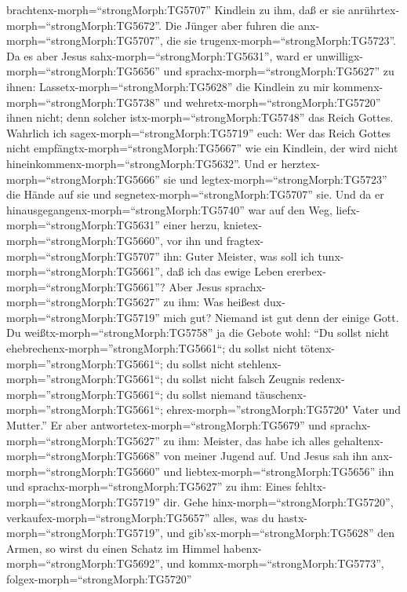 brachtenx-morph=``strongMorph:TG5707'' Kindlein zu ihm, daß er sie
anrührtex-morph=``strongMorph:TG5672''. Die Jünger aber fuhren die
anx-morph=``strongMorph:TG5707'', die sie
trugenx-morph=``strongMorph:TG5723''.  Da es aber Jesus
sahx-morph=``strongMorph:TG5631'', ward er
unwilligx-morph=``strongMorph:TG5656'' und
sprachx-morph=``strongMorph:TG5627'' zu ihnen:
Lassetx-morph=``strongMorph:TG5628'' die Kindlein zu mir
kommenx-morph=``strongMorph:TG5738'' und
wehretx-morph=``strongMorph:TG5720'' ihnen nicht; denn solcher
istx-morph=``strongMorph:TG5748'' das Reich Gottes. 
Wahrlich ich sagex-morph=``strongMorph:TG5719'' euch: Wer das Reich
Gottes nicht empfängtx-morph=``strongMorph:TG5667'' wie ein Kindlein,
der wird nicht hineinkommenx-morph=``strongMorph:TG5632''. 
Und er herztex-morph=``strongMorph:TG5666'' sie und
legtex-morph=``strongMorph:TG5723'' die Hände auf sie und
segnetex-morph=``strongMorph:TG5707'' sie.  Und da er
hinausgegangenx-morph=``strongMorph:TG5740'' war auf den Weg,
liefx-morph=``strongMorph:TG5631'' einer herzu,
knietex-morph=``strongMorph:TG5660'', vor ihn und
fragtex-morph=``strongMorph:TG5707'' ihn: Guter Meister, was soll ich
tunx-morph=``strongMorph:TG5661'', daß ich das ewige Leben
ererbex-morph=``strongMorph:TG5661''?  Aber Jesus
sprachx-morph=``strongMorph:TG5627'' zu ihm: Was heißest
dux-morph=``strongMorph:TG5719'' mich gut? Niemand ist gut denn der
einige Gott.  Du weißtx-morph=``strongMorph:TG5758'' ja die
Gebote wohl: ``Du sollst nicht ehebrechenx-morph=''strongMorph:TG5661``;
du sollst nicht tötenx-morph=''strongMorph:TG5661``; du sollst nicht
stehlenx-morph=''strongMorph:TG5661``; du sollst nicht falsch Zeugnis
redenx-morph=''strongMorph:TG5661``; du sollst niemand
täuschenx-morph=''strongMorph:TG5661``;
ehrex-morph=''strongMorph:TG5720" Vater und Mutter.''  Er
aber antwortetex-morph=``strongMorph:TG5679'' und
sprachx-morph=``strongMorph:TG5627'' zu ihm: Meister, das habe ich alles
gehaltenx-morph=``strongMorph:TG5668'' von meiner Jugend auf.
 Und Jesus sah ihn anx-morph=``strongMorph:TG5660'' und
liebtex-morph=``strongMorph:TG5656'' ihn und
sprachx-morph=``strongMorph:TG5627'' zu ihm: Eines
fehltx-morph=``strongMorph:TG5719'' dir. Gehe
hinx-morph=``strongMorph:TG5720'',
verkaufex-morph=``strongMorph:TG5657'' alles, was du
hastx-morph=``strongMorph:TG5719'', und
gib'sx-morph=``strongMorph:TG5628'' den Armen, so wirst du einen Schatz
im Himmel habenx-morph=``strongMorph:TG5692'', und
kommx-morph=``strongMorph:TG5773'', folgex-morph=``strongMorph:TG5720''
